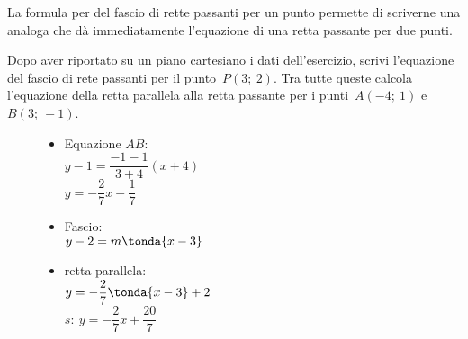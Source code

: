 La formula per del fascio di rette passanti per un punto permette di 
scriverne una analoga che dà immediatamente l'equazione di una retta passante 
per due punti.

 \begin{esempio}
  Dopo aver riportato su un piano cartesiano i dati dell'esercizio,
  scrivi l'equazione del fascio di rete passanti per il punto~\(P(3;~2)\).
  Tra tutte queste calcola l'equazione della retta parallela alla retta 
  passante per i punti~\(A(-4;~1)\) e~\(B(3;~-1)\).
  
\begin{inaccessibleblock}
 \begin{figure}[h]
\centering \hspace{-5mm}
 \begin{minipage}[]{.40\textwidth}
  \begin{itemize}
  \item Equazione \(AB\):\\
\(y - 1 = \dfrac{-1 - 1}{3 +4} (x +4)\)\\
  \(y = -\dfrac{2}{7} x -\dfrac{1}{7}\)
  \item Fascio: \\
  \(y - 2 = m \tonda{x - 3}\)
  \item retta parallela: \\
  \(y = -\dfrac{2}{7} \tonda{x - 3} +2\)\\
  \(s:~y = -\dfrac{2}{7} x +\dfrac{20}{7}\)
  \end{itemize}
 \end{minipage}
 \begin{minipage}[]{.60\textwidth}
   \centering \duepuntiparall
 \end{minipage}
\label{fig:duepuntiparall}
\end{figure}
\end{inaccessibleblock}
 \end{esempio}

